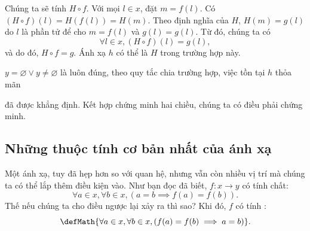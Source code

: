 Chúng ta sẽ tính $H\circ f$. Với mọi $l \in x$, đặt $m = f(l)$. Có $(H\circ f)(l) = H(f(l)) = H(m)$. Theo định nghĩa của $H$, $H(m) = g(l)$ do $l$ là phần tử để cho $m = f(l)$ và $g(l) = g(l)$. Từ đó, chúng ta có $$\forall l \in x, (H\circ f)(l) = g(l),$$ và do đó, $H\circ f = g$. Ánh xạ $h$ có thể là $H$ trong trường hợp này.

$y = \varnothing \lor y \neq \varnothing$ là luôn đúng, theo quy tắc chia trường hợp, việc tồn tại $h$ thỏa mãn  đã được khẳng định. Kết hợp chứng minh hai chiều, chúng ta có điều phải chứng minh.

\subsection{Những thuộc tính cơ bản nhất của ánh xạ}

Một ánh xạ, tuy đã hẹp hơn so với quan hệ, nhưng vẫn còn nhiều vị trí mà chúng ta có thể lắp thêm điều kiện vào. Như bạn đọc đã biết, $f: x \to y$ có tính chất:
\begin{equation*}
   \forall a \in x, \forall b \in x, (a = b \implies f(a) = f(b)).
\end{equation*}
Thế nếu chúng ta cho điều ngược lại xảy ra thì sao? Khi đó, $f$ có tính : \begin{equation*}
   \defMath{\forall a \in x, \forall b \in x, (f(a) = f(b) \implies a = b)}.
\end{equation*}

